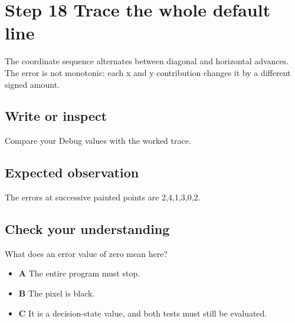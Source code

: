 \section{Step 18 Trace the whole default
  line}\label{007-bresenham-line-s18-step-18-trace-the-whole-default-line}

The coordinate sequence alternates between diagonal and horizontal
advances. The error is not monotonic: each x and y contribution changes
it by a different signed amount.

\subsection{Write or
  inspect}\label{007-bresenham-line-s18-write-or-inspect}

Compare your Debug values with the worked trace.

\subsection{Expected
  observation}\label{007-bresenham-line-s18-expected-observation}

The errors at successive painted points are 2,4,1,3,0,2.

\subsection{Check your
  understanding}\label{007-bresenham-line-s18-check-your-understanding}

What does an error value of zero mean here?

\begin{itemize}
  \tightlist
  \item
        \textbf{A} The entire program must stop.
  \item
        \textbf{B} The pixel is black.
  \item
        \textbf{C} It is a decision-state value, and both tests must still be
        evaluated.
\end{itemize}
